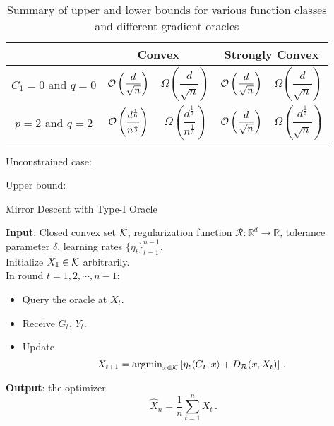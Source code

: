 
\begin{table*}
\centering
 \caption{Summary of upper and lower bounds for various function classes and different gradient oracles}
\label{tab:mse-1}
\begin{tabular}{|c|c|c|c|c|}
\toprule
\rowcolor{gray!20}
  \multirow{2}{*}{\textbf{Oracle type}} & \multicolumn{2}{|c|}{\multirow{2}{*}{\textbf{Convex}}} & \multicolumn{2}{|c|}{\multirow{2}{*}{\textbf{Strongly Convex}}} \\[1.7em]
 \midrule
\multirow{2}{*}{ $C_1=0$ and $q=0$} & \multirow{2}{*}{$\O\left(\dfrac{d}{\sqrt{n}}\right)$}  & \multirow{2}{*}{$\Omega\left(\dfrac{d}{\sqrt{n}}\right)$} & \multirow{2}{*}{$\O\left(\dfrac{d}{\sqrt{n}}\right)$}  & \multirow{2}{*}{$\Omega\left(\dfrac{d}{\sqrt{n}}\right)$}  \\[1.5em]\midrule
\multirow{2}{*}{ $p=1$ and $q=2$} & \multirow{2}{*}{$\O\left(\dfrac{d^{\frac{1}{4}}}{n^{\frac{1}{4}}}\right)$}  & \multirow{2}{*}{$\Omega\left(\dfrac{d^\frac{1}{4}}{n^\frac{1}{4}}\right)$}& \multirow{2}{*}{$\O\left(\dfrac{d}{\sqrt{n}}\right)$}  & \multirow{2}{*}{$\Omega\left(\dfrac{d^\frac{1}{4}}{\sqrt{n}}\right)$} \\[1.5em]\midrule
\multirow{2}{*}{ $p=2$ and $q=2$} & \multirow{2}{*}{$\mathcal{O}\left(\dfrac{d^{\frac{1}{6}}}{n^{\frac{1}{3}}}\right)$}  & \multirow{2}{*}{$\Omega\left(\dfrac{d^\frac{1}{6}}{n^\frac{1}{3}}\right)$} & \multirow{2}{*}{$\O\left(\dfrac{d}{\sqrt{n}}\right)$}  & \multirow{2}{*}{$\Omega\left(\dfrac{d^\frac{1}{6}}{\sqrt{n}}\right)$}\\[1.5em]
 \bottomrule 
\end{tabular}
\end{table*}

Unconstrained case:

Upper bound: 

\begin{algorithm}
	\caption{Mirror Descent with Type-I Oracle}\label{alg}
	\textbf{Input}: Closed convex set $\mathcal{K}$, regularization function $\mathcal{R}:\mathbb{R}^d\to \mathbb{R}$, tolerance parameter $\delta$, learning rates $\{\eta_t\}_{t=1}^{n-1}$. \\
	Initialize $X_1\in \mathcal{K}$ arbitrarily.\\
	In round $t=1, 2, \cdots, n-1$:
	\begin{itemize}
	\item Query the oracle at $X_t$.
	\item Receive $G_t$, $Y_t$.
	\item Update
	\[
	X_{t+1}=\operatorname{argmin}_{x\in \mathcal{K}}\left[ \eta_{t} \langle G_t,x \rangle+D_{\mathcal{R}}(x,X_t) \right] \,.
	\]
	\end{itemize}
	\textbf{Output}: the optimizer
	\[
	\hat{X}_n = \dfrac{1}{n}\sum_{t=1}^n X_t \,.
	\]
	
\end{algorithm}

